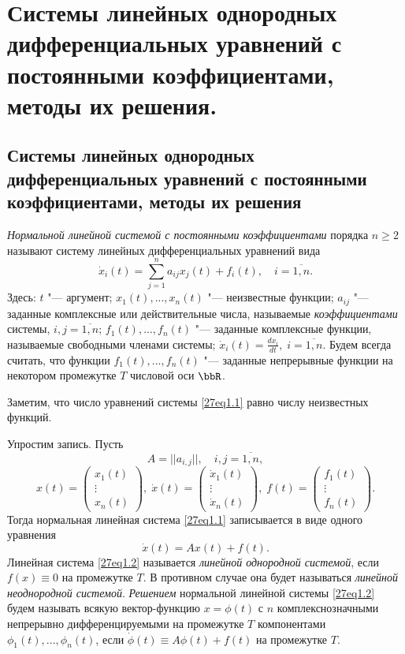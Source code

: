\chapter{Системы линейных однородных дифференциальных уравнений с постоянными коэффициентами, методы их решения.}
\section{Системы линейных однородных дифференциальных уравнений с постоянными коэффициентами, методы их решения}
\begin{defn}\label{ch27defn1}
\textit{Нормальной линейной системой с постоянными коэффициентами} порядка $n\ge 2$ называют систему линейных дифференциальных уравнений вида
\begin{equation}\label{27eq1.1}
\dot x_i(t)=\sum\limits_{j=1}^n a_{ij}x_j(t)+f_i(t),\quad i=\overline{1,n}.
\end{equation}
Здесь: $t$ "--- аргумент; $x_1(t),...,x_n(t)$ "--- неизвестные функции; $a_{ij}$ "--- заданные комплексные или действительные числа, называемые \textit{коэффициентами} системы, $i,j=\overline{1,n}$; $f_1(t),...,f_n(t)$ "--- заданные комплексные функции, называемые свободными членами системы; $\dot x_i(t)=\frac{dx_i}{dt},\; i=\overline{1,n}$. Будем всегда считать, что функции $f_1(t),...,f_n(t)$ "--- заданные непрерывные функции на некотором промежутке $T$ числовой оси $\bbR$.
\end{defn}
Заметим, что число уравнений системы \eqref{27eq1.1} равно числу неизвестных функций.

Упростим запись. Пусть
$$
A=||a_{i,j}||,\quad i,j=\overline{1,n},
$$
$$
x(t)=\begin{pmatrix}
x_1(t)\\ \vdots \\ x_n(t)
\end{pmatrix},\;
\dot x(t)=\begin{pmatrix}
\dot x_1(t)\\ \vdots \\ \dot x_n(t)
\end{pmatrix},\;
f(t)=\begin{pmatrix}
f_1(t)\\ \vdots \\ f_n(t)
\end{pmatrix}.
$$
Тогда нормальная линейная система \eqref{27eq1.1} записывается в виде одного уравнения 
\begin{equation} \label{27eq1.2}
\dot x(t)=Ax(t)+f(t).
\end{equation}
Линейная система \eqref{27eq1.2} называется \textit{линейной однородной системой}, если $f(x)\equiv 0$ на промежутке $T$. В противном случае она будет называться \textit{линейной неоднородной системой}. \textit{Решением} нормальной линейной системы \eqref{27eq1.2} будем называть всякую вектор-функцию  $x=\phi(t)$ с $n$ комплекснозначными непрерывно дифференцируемыми на промежутке $T$ компонентами $\phi_1(t),...,\phi_n(t)$, если $\dot \phi(t)\equiv A\phi(t)+f(t)$ на промежутке $T$.

